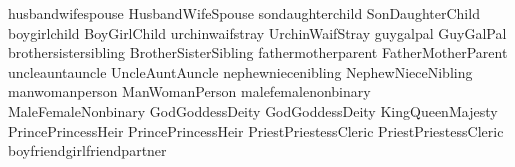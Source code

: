 \mfornb{\spouse}	{husband}{wife}{spouse}
\mfornb{\Spouse}	{Husband}{Wife}{Spouse}
\mfornb{\child}	{son}{daughter}{child}
\mfornb{\Child}	{Son}{Daughter}{Child}
\mfornb{\kid}		{boy}{girl}{child}
\mfornb{\Kid}		{Boy}{Girl}{Child}
\mfornb{\stray}	{urchin}{waif}{stray}
\mfornb{\Stray}	{Urchin}{Waif}{Stray}
\mfornb{\pal}		{guy}{gal}{pal}
\mfornb{\Pal}		{Guy}{Gal}{Pal}
\mfornb{\sibling}	{brother}{sister}{sibling}
\mfornb{\Sibling}	{Brother}{Sister}{Sibling}
\mfornb{\parent}	{father}{mother}{parent}
\mfornb{\Parent}	{Father}{Mother}{Parent}
\mfornb{\auncle}	{uncle}{aunt}{auncle}
\mfornb{\Auncle}	{Uncle}{Aunt}{Auncle}
\mfornb{\nibling}	{nephew}{niece}{nibling}
\mfornb{\Nibling}	{Nephew}{Niece}{Nibling}
\mfornb{\person}	{man}{woman}{person} %
\mfornb{\Person}	{Man}{Woman}{Person}
\mfornb{\sex}		{male}{female}{nonbinary}
\mfornb{\Sex}		{Male}{Female}{Nonbinary}
\mfornb{\God}		{God}{Goddess}{Deity}
\mfornb{\Deity}		{God}{Goddess}{Deity}
\mfornb{\Majesty}		{King}{Queen}{Majesty}
\mfornb{\Heir}		{Prince}{Princess}{Heir}
\mfornb{\heir}		{Prince}{Princess}{Heir}
\mfornb{\cleric}		{Priest}{Priestess}{Cleric}
\mfornb{\clergy}		{Priest}{Priestess}{Cleric}
\mfornb{\partner}	{boyfriend}{girlfriend}{partner}


